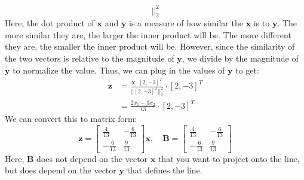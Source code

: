 \begin{enumerate}[label=(\alph*)]
\begin{tcolorbox}
\[{				      ||_2^2}
		      \]
		      Here, the dot product of $\mathbf{x}$ and $\mathbf{y}$ is a
		      measure of how similar the $\mathbf{x}$ is to $\mathbf{y}$.
		      The more similar they
		      are, the larger the inner product will be. The more different they
		      are, the smaller the inner product will be. However, since the
		      similarity of the two vectors is relative to the magnitude of
		      $\mathbf{y}$, we divide by the magnitude of $\mathbf{y}$ to
		      normalize the value. Thus, we
		      can plug in the values of $\mathbf{y}$ to get:
		      $$
			      \begin{aligned}
				      \mathbf{z} & = \frac{\mathbf{x} \cdot \left[ 2, -3
						      \right]^T}{|| \left[ 2, -3 \right]^T ||_2^2} \cdot
				      \left[ 2, -3 \right]^T                                   \\
				                 & = \frac{2x_1 - 3x_2}{13} \cdot \left[ 2, -3
					      \right]^T
			      \end{aligned}
		      $$
		      We can convert this to matrix form:
		      $$
			      \mathbf{z} =
			      \begin{bmatrix}
				      \frac{4}{13}  & -\frac{6}{13} \\
				      -\frac{6}{13} & \frac{9}{13}
			      \end{bmatrix}
			      \mathbf{x}, \quad
			      \mathbf{B} =
			      \begin{bmatrix}
				      \frac{4}{13}  & -\frac{6}{13} \\
				      -\frac{6}{13} & \frac{9}{13}
			      \end{bmatrix}
		      $$
		      Here, $\mathbf{B}$ does not depend on the vector $\mathbf{x}$ that
		      you want to project onto the line, but does depend on the vector
		      $\mathbf{y}$ that defines the line.
	      \end{tcolorbox}
\end{enumerate}
